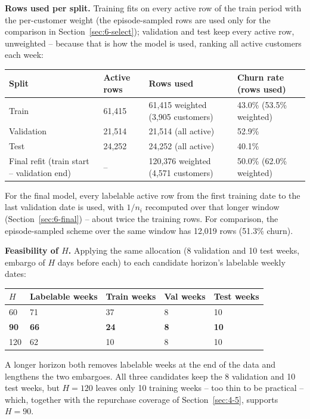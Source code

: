 \textbf{Rows used per split.} Training fits on every active row of the train period with the per-customer weight (the episode-sampled rows are used only for the comparison in Section~\ref{sec:6-select}); validation and test keep every active row, unweighted -- because that is how the model is used, ranking all active customers each week:

\begin{center}
\begin{tabular}{@{}p{3.4cm}p{2.6cm}p{4.2cm}p{2.3cm}@{}}
    \toprule
    Split & Active rows & Rows used & Churn rate (rows used) \\
    \midrule
    Train & 61,415 & 61,415 weighted (3,905 customers) & 43.0\% (53.5\% weighted) \\
    Validation & 21,514 & 21,514 (all active) & 52.9\% \\
    Test & 24,252 & 24,252 (all active) & 40.1\% \\
    Final refit (train start -- validation end) & -- & 120,376 weighted (4,571 customers) & 50.0\% (62.0\% weighted) \\
    \bottomrule
\end{tabular}
\end{center}

For the final model, every labelable active row from the first training date to the last validation date is used, with $1/n_i$ recomputed over that longer window (Section~\ref{sec:6-final}) -- about twice the training rows. For comparison, the episode-sampled scheme over the same window has 12,019 rows (51.3\% churn).

\textbf{Feasibility of $H$.} Applying the same allocation (8 validation and 10 test weeks, embargo of $H$ days before each) to each candidate horizon's labelable weekly dates:

\begin{center}
\begin{tabular}{@{}p{1.8cm}p{2.6cm}p{2.3cm}p{2.1cm}p{2.1cm}@{}}
    \toprule
    $H$ & Labelable weeks & Train weeks & Val weeks & Test weeks \\
    \midrule
    60 & 71 & 37 & 8 & 10 \\
    \textbf{90} & \textbf{66} & \textbf{24} & \textbf{8} & \textbf{10} \\
    120 & 62 & 10 & 8 & 10 \\
    \bottomrule
\end{tabular}
\end{center}

A longer horizon both removes labelable weeks at the end of the data and lengthens the two embargoes. All three candidates keep the 8 validation and 10 test weeks, but $H = 120$ leaves only 10 training weeks -- too thin to be practical -- which, together with the repurchase coverage of Section~\ref{sec:4-5}, supports $H = 90$.

